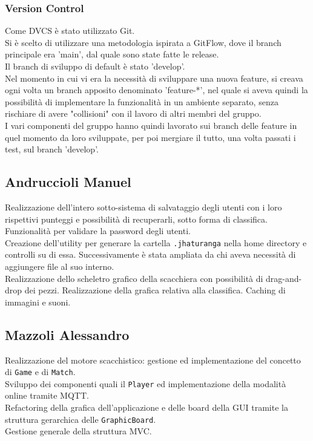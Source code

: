 \documentclass[a4paper,12pt]{report}
\begin{document}
\subsubsection{Version Control}
Come DVCS è stato utilizzato Git.
\\
Si è scelto di utilizzare una metodologia ispirata a GitFlow, dove il branch principale era 'main', dal quale sono state fatte le release.
\\
Il branch di sviluppo di default è stato 'develop'.
\\
Nel momento in cui vi era la necessità di sviluppare una nuova feature, si creava ogni volta un branch apposito denominato 'feature-*', nel quale si aveva quindi la possibilità di implementare la funzionalità in un ambiente separato, senza rischiare di avere "collisioni" con il lavoro di altri membri del gruppo.
\\
I vari componenti del gruppo hanno quindi lavorato sui branch delle feature in quel momento da loro sviluppate, per poi mergiare il tutto, una volta passati i test, sul branch 'develop'.

\subsection{Andruccioli Manuel}
Realizzazione dell'intero sotto-sistema di salvataggio degli utenti con i loro rispettivi punteggi e possibilità di recuperarli, sotto forma di classifica. Funzionalità per validare la password degli utenti.
\\
Creazione dell'utility per generare la cartella \texttt{.jhaturanga} nella home directory e controlli su di essa. Successivamente è stata ampliata da chi aveva necessità di aggiungere file al suo interno.
\\
Realizzazione dello scheletro grafico della scacchiera con possibilità di drag-and-drop dei pezzi. Realizzazione della grafica relativa alla classifica. Caching di immagini e suoni.

\subsection{Mazzoli Alessandro}
Realizzazione del motore scacchistico: gestione ed implementazione del concetto di  \texttt{Game} e di \texttt{Match}.
\\
Sviluppo dei componenti quali il \texttt{Player} ed implementazione della modalità online tramite MQTT.
\\
Refactoring della grafica dell'applicazione e delle board della GUI tramite la struttura gerarchica delle \texttt{GraphicBoard}.
\\
Gestione generale della struttura MVC.
\end{document}
